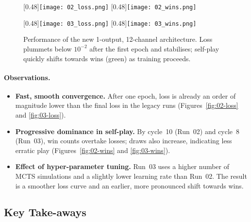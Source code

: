 \documentclass{report}
\begin{document}
\begin{figure}[htbp]
  \centering
    [0.48\linewidth]{\texttt{[image: 02\_loss.png]}}
  \hfill
    [0.48\linewidth]{\texttt{[image: 02\_wins.png]}}

  \vspace{1em}

    [0.48\linewidth]{\texttt{[image: 03\_loss.png]}}
  \hfill
    [0.48\linewidth]{\texttt{[image: 03\_wins.png]}}
  \caption{Performance of the new 1-output, 12-channel architecture.  
           Loss plummets below $10^{-2}$ after the first epoch and stabilises; 
           self-play quickly shifts towards wins (green) as training proceeds.}
  \label{fig:new}
\end{figure}

\paragraph{Observations.}
\begin{itemize}
  \item \textbf{Fast, smooth convergence.}  
        After one epoch, loss is already an order of magnitude lower than the
        final loss in the legacy runs
        (Figures~\ref{fig:02-loss} and \ref{fig:03-loss}).
  \item \textbf{Progressive dominance in self-play.}  
        By cycle~10 (Run~02) and cycle~8 (Run~03), win counts overtake losses;
        draws also increase, indicating less erratic play
        (Figures~\ref{fig:02-wins} and \ref{fig:03-wins}).
  \item \textbf{Effect of hyper-parameter tuning.}  
        Run~03 uses a higher number of MCTS simulations and a slightly lower
        learning rate than Run~02.  
        The result is a smoother loss curve and an earlier, more pronounced
        shift towards wins.
\end{itemize}

\subsection{Key Take-aways}
\end{document}
